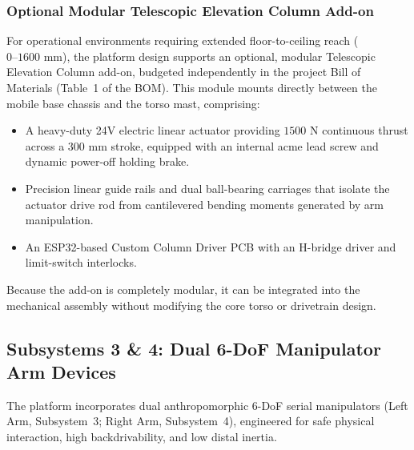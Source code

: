 \subsubsection{Optional Modular Telescopic Elevation Column Add-on}
For operational environments requiring extended floor-to-ceiling reach ($0\text{--}1600\text{ mm}$), the platform design supports an optional, modular Telescopic Elevation Column add-on, budgeted independently in the project Bill of Materials (Table~1 of the BOM). This module mounts directly between the mobile base chassis and the torso mast, comprising:
\begin{itemize}[leftmargin=1.5em]
  \item A heavy-duty 24V electric linear actuator providing $1500\text{ N}$ continuous thrust across a $300\text{ mm}$ stroke, equipped with an internal acme lead screw and dynamic power-off holding brake.
  \item Precision linear guide rails and dual ball-bearing carriages that isolate the actuator drive rod from cantilevered bending moments generated by arm manipulation.
  \item An ESP32-based Custom Column Driver PCB with an H-bridge driver and limit-switch interlocks.
\end{itemize}
Because the add-on is completely modular, it can be integrated into the mechanical assembly without modifying the core torso or drivetrain design.

\subsection{Subsystems 3 \& 4: Dual 6-DoF Manipulator Arm Devices}
\label{subsec:subsystems_3_4_arms}
The platform incorporates dual anthropomorphic 6-DoF serial manipulators (Left Arm, Subsystem~3; Right Arm, Subsystem~4), engineered for safe physical interaction, high backdrivability, and low distal inertia.

